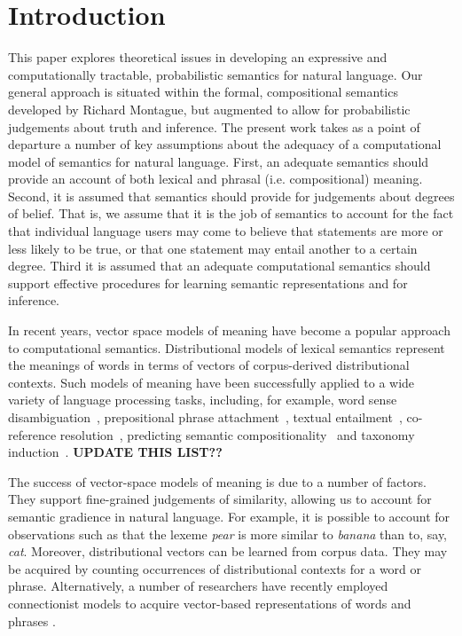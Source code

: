 \documentclass[11pt]{article}
\theoremstyle{definition}
\begin{document}
\section{Introduction}

This paper explores theoretical  issues in developing an expressive and computationally tractable, probabilistic semantics for natural language.  Our general approach is situated within the formal, compositional semantics developed by Richard Montague, but augmented to allow for probabilistic judgements about truth and inference. The present work takes  as a point of departure a number of key assumptions about the adequacy of a computational model of semantics for natural language. First, an adequate semantics should provide an account of both lexical and phrasal (i.e. compositional) meaning. Second, it is assumed that semantics should provide for judgements about degrees of belief. That is, we assume that it is the job of semantics to account for the fact that individual language users may come to believe that statements are more or less likely to be true, or that one statement may entail another to a certain degree. Third it is assumed that an adequate computational semantics should support effective procedures for learning semantic representations and for inference.

In recent years, vector space models of meaning have become a popular approach to computational semantics.
Distributional models of lexical semantics represent the meanings of words in terms of vectors of corpus-derived distributional contexts.
Such models of meaning have been successfully applied to a wide variety of language processing tasks, including, for example, word sense disambiguation~\cite{miller-EtAl:2012:PAPERS,khapra-EtAl:2010:ACL}, prepositional phrase attachment~\cite{Calvo05distributionalthesaurus}, textual entailment~\cite{berant-dagan-goldberger:2010:ACL}, co-reference resolution~\cite{lee-EtAl:2012:EMNLP-CoNLL}, predicting semantic compositionality~\cite{bergsma-EtAl:2010:EMNLP} and taxonomy induction~\cite{fountain-lapata:2012:NAACL-HLT}. {\bf UPDATE THIS LIST??}

The success of vector-space models of meaning is due to a number of factors. They support fine-grained judgements of similarity, allowing us to account for semantic gradience in natural language. For example, it is possible to account for observations such as that the lexeme {\em pear} is more similar to {\em banana}  than to, say, {\em cat}. Moreover, distributional vectors can be learned from corpus data. They may be acquired by counting occurrences of distributional contexts for a word or phrase. Alternatively, a number of researchers have recently employed connectionist models  to acquire vector-based representations of words and phrases \cite{Socher:12}. 
\end{document}
